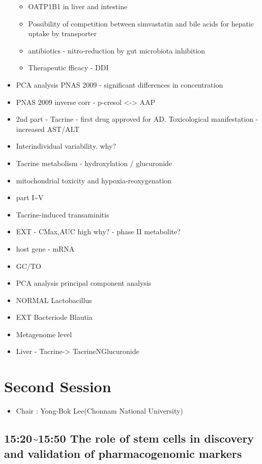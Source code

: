 \documentclass[]{book}
\providecommand{\tightlist}{%
  \setlength{\itemsep}{0pt}\setlength{\parskip}{0pt}}
\begin{document}
\begin{itemize}
  \begin{itemize}
  \tightlist
  \item
    OATP1B1 in liver and intestine
  \item
    Possibility of competition between simvastatin and bile acids for
    hepatic uptake by transporter
  \item
    antibiotics - nitro-reduction by gut microbiota inhibition
  \item
    Therapeutic fficacy - DDI
  \end{itemize}
\item
  PCA analysis PNAS 2009 - significant differences in concentration
\item
  PNAS 2009 inverse corr - p-cresol \textless{}-\textgreater{} AAP
\item
  2nd part - Tacrine - first drug approved for AD. Toxicological
  manifestation - increased AST/ALT
\item
  Interindividual variability. why?
\item
  Tacrine metabolism - hydroxylation / glucuronide
\item
  mitochondrial toxicity and hypoxia-reoxygenation
\item
  part I\textasciitilde{}V
\item
  Tacrine-induced transaminitis
\item
  EXT - CMax,AUC high why? - phase II metabolite?
\item
  host gene - mRNA
\item
  GC/TO
\item
  PCA analysis principal component analysis
\item
  NORMAL Lactobacillus
\item
  EXT Bacteriode Blautia
\item
  Metagenome level
\item
  Liver - Tacrine-\textgreater{} TacrineNGlucuronide
\end{itemize}

\section{Second Session}\label{second-session}

\begin{itemize}
\tightlist
\item
  Chair : Yong-Bok Lee(Chonnam National University)
\end{itemize}

\subsection{15:20\textasciitilde{}15:50 The role of stem cells in
discovery and validation of pharmacogenomic
markers}\label{the-role-of-stem-cells-in-discovery-and-validation-of-pharmacogenomic-markers}
\end{document}
